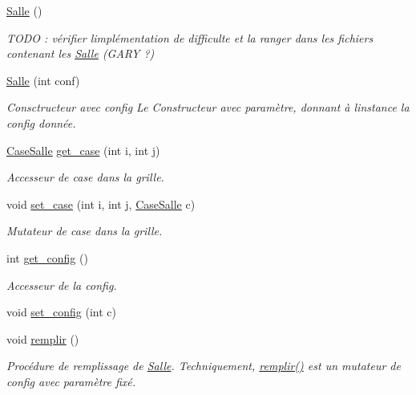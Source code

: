 \begin{DoxyCompactItemize}
\item 
\hyperlink{classSalle_a4cb05b76fb2b5430ac2bf903b8f75906}{Salle} ()
\begin{DoxyCompactList}\small\item\em T\+O\+DO \+: vérifier l\textquotesingle{}implémentation de difficulte et la ranger dans les fichiers contenant les \hyperlink{classSalle}{Salle} (G\+A\+RY ?) \end{DoxyCompactList}\item 
\hyperlink{classSalle_ad5b7cf5a8567b142dd3ed77b39480afb}{Salle} (int conf)
\begin{DoxyCompactList}\small\item\em Consctructeur avec {\itshape config} Le Constructeur avec paramètre, donnant à l\textquotesingle{}instance la {\itshape config} donnée. \end{DoxyCompactList}\item 
\hyperlink{classCaseSalle}{Case\+Salle} \hyperlink{classSalle_aae17412fe140b77d027fdc3553ecd33c}{get\+\_\+case} (int i, int j)
\begin{DoxyCompactList}\small\item\em Accesseur de case dans la grille. \end{DoxyCompactList}\item 
void \hyperlink{classSalle_ac0ce53372cead99268609aba57d0fff2}{set\+\_\+case} (int i, int j, \hyperlink{classCaseSalle}{Case\+Salle} c)
\begin{DoxyCompactList}\small\item\em Mutateur de case dans la grille. \end{DoxyCompactList}\item 
int \hyperlink{classSalle_a9268968ab5741a35da4e52399a4be0b7}{get\+\_\+config} ()
\begin{DoxyCompactList}\small\item\em Accesseur de la {\itshape config}. \end{DoxyCompactList}\item 
void \hyperlink{classSalle_a3d8b62393fd9cfa15bb385e187e72189}{set\+\_\+config} (int c)
\item 
void \hyperlink{classSalle_ae6fd7211225455d887859f983e3bddce}{remplir} ()
\begin{DoxyCompactList}\small\item\em Procédure de remplissage de \hyperlink{classSalle}{Salle}. Techniquement, \hyperlink{classSalle_ae6fd7211225455d887859f983e3bddce}{remplir()} est un mutateur de {\itshape config} avec paramètre fixé. \end{DoxyCompactList}\item 

\end{DoxyCompactItemize}
